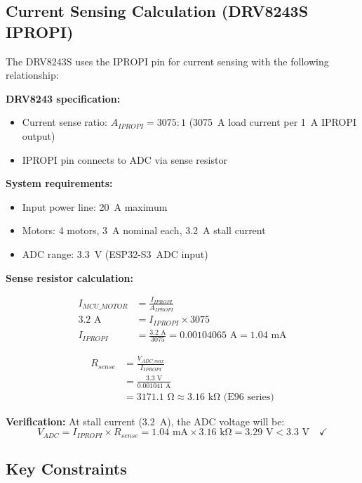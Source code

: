 \subsection{Current Sensing Calculation (DRV8243S IPROPI)}

The DRV8243S uses the IPROPI pin for current sensing with the following relationship:

\textbf{DRV8243 specification:}
\begin{itemize}
    \item Current sense ratio: $A_{IPROPI} = 3075:1$ (3075~A load current per 1~A IPROPI output)
    \item IPROPI pin connects to ADC via sense resistor
\end{itemize}

\textbf{System requirements:}
\begin{itemize}
    \item Input power line: 20~A maximum
    \item Motors: 4 motors, 3~A nominal each, 3.2~A stall current
    \item ADC range: 3.3~V (ESP32-S3~ADC input)
\end{itemize}

\textbf{Sense resistor calculation:}

\begin{align}
I_{MCU\_MOTOR} &= \frac{I_{IPROPI}}{A_{IPROPI}} \\
3.2 \text{ A} &= I_{IPROPI} \times 3075 \\
I_{IPROPI} &= \frac{3.2 \text{ A}}{3075} = 0.00104065 \text{ A} = 1.04 \text{ mA}
\end{align}

\begin{align}
R_{sense} &= \frac{V_{ADC\_max}}{I_{IPROPI}} \\
          &= \frac{3.3 \text{ V}}{0.001041 \text{ A}} \\
          &= 3171.1 \text{ Ω} \approx 3.16 \text{ kΩ (E96 series)}
\end{align}

\textbf{Verification:}
At stall current (3.2~A), the ADC voltage will be:
\begin{equation}
V_{ADC} = I_{IPROPI} \times R_{sense} = 1.04 \text{ mA} \times 3.16 \text{ kΩ} = 3.29 \text{ V} < 3.3 \text{ V} \quad \checkmark
\end{equation}

\subsection{Key Constraints}

